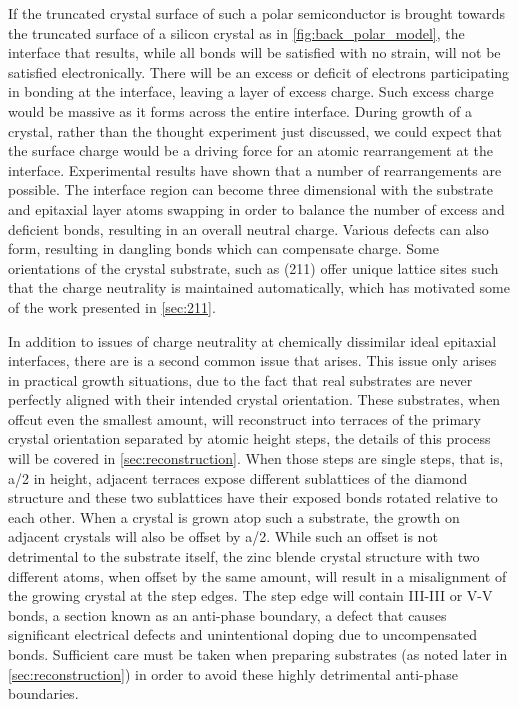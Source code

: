 If the truncated crystal surface of such a polar semiconductor is brought towards the truncated surface of a silicon crystal as in \cref{fig:back_polar_model}, the interface that results, while all bonds will be satisfied with no strain, will not be satisfied electronically. There will be an excess or deficit of electrons participating in bonding at the interface, leaving a layer of excess charge. Such excess charge would be massive as it forms across the entire interface. During growth of a crystal, rather than the thought experiment just discussed, we could expect that the surface charge would be a driving force for an atomic rearrangement at the interface. Experimental results have shown that a number of rearrangements are possible. The interface region can become three dimensional with the substrate and epitaxial layer atoms swapping in order to balance the number of excess and deficient bonds, resulting in an overall neutral charge. Various defects can also form, resulting in dangling bonds which can compensate charge. Some orientations of the crystal substrate, such as (211) offer unique lattice sites such that the charge neutrality is maintained automatically, which has motivated some of the work presented in \cref{sec:211}.

In addition to issues of charge neutrality at chemically dissimilar ideal epitaxial interfaces, there are is a second common issue that arises. This issue only arises in practical growth situations, due to the fact that real substrates are never perfectly aligned with their intended crystal orientation. These substrates, when offcut even the smallest amount, will reconstruct into terraces of the primary crystal orientation separated by atomic height steps, the details of this process will be covered in \cref{sec:reconstruction}. When those steps are single steps, that is, a/2 in height, adjacent terraces expose different sublattices of the diamond structure and these two sublattices have their exposed bonds rotated relative to each other. When a crystal is grown atop such a substrate, the growth on adjacent crystals will also be offset by a/2. While such an offset is not detrimental to the substrate itself, the zinc blende crystal structure with two different atoms, when offset by the same amount, will result in a misalignment of the growing crystal at the step edges. The step edge will contain III-III or V-V bonds, a section known as an anti-phase boundary, a defect that causes significant electrical defects and unintentional doping due to uncompensated bonds. Sufficient care must be taken when preparing substrates (as noted later in \cref{sec:reconstruction}) in order to avoid these highly detrimental anti-phase boundaries.

